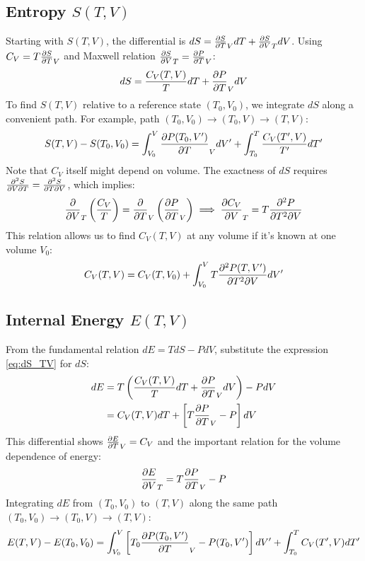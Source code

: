 \documentclass[10pt, letterpaper]{article}
\begin{document}
\subsection{Entropy $S(T,V)$}
Starting with $S(T,V)$, the differential is $dS = \pdv{S}{T}_{V} dT + \pdv{S}{V}_{T} dV$.
Using $C_V = T \pdv{S}{T}_{V}$ and Maxwell relation $\pdv{S}{V}_{T} = \pdv{P}{T}_{V}$:
\begin{equation} \label{eq:dS_TV}
    dS = \frac{C_V(T,V)}{T} dT + \pdv{P}{T}_{V} dV
\end{equation}
To find $S(T,V)$ relative to a reference state $(T_0, V_0)$, we integrate $dS$ along a convenient path. For example, path $(T_0, V_0) \to (T_0, V) \to (T, V)$:
\begin{equation}
    S(T,V) - S(T_0,V_0) = \int_{V_0}^V \pdv{P(T_0, V')}{T}_{V} dV' + \int_{T_0}^T \frac{C_V(T', V)}{T'} dT'
\end{equation}
Note that $C_V$ itself might depend on volume. The exactness of $dS$ requires $\pdv[2]{S}{V}{T} = \pdv[2]{S}{T}{V}$, which implies:
\begin{equation*}
    \pdv{}{V}_T \left( \frac{C_V}{T} \right) = \pdv{}{T}_V \left( \pdv{P}{T}_{V} \right) \implies \pdv{C_V}{V}_{T} = T \pdv[2]{P}{T^2}{V}
\end{equation*}
This relation allows us to find $C_V(T,V)$ at any volume if it's known at one volume $V_0$:
\begin{equation*}
    C_V(T,V) = C_V(T,V_0) + \int_{V_0}^V T \pdv[2]{P(T, V')}{T^2}{V} dV'
\end{equation*}

\subsection{Internal Energy $E(T,V)$}
From the fundamental relation $dE = T dS - P dV$, substitute the expression \eqref{eq:dS_TV} for $dS$:
\begin{align*}
    dE &= T \left( \frac{C_V(T,V)}{T} dT + \pdv{P}{T}_{V} dV \right) - P dV \\
       &= C_V(T,V) dT + \left[ T \pdv{P}{T}_{V} - P \right] dV
\end{align*}
This differential shows $\pdv{E}{T}_{V} = C_V$ and the important relation for the volume dependence of energy:
\begin{equation} \label{eq:dEdV_T}
    \pdv{E}{V}_{T} = T \pdv{P}{T}_{V} - P
\end{equation}
Integrating $dE$ from $(T_0, V_0)$ to $(T, V)$ along the same path $(T_0, V_0) \to (T_0, V) \to (T, V)$:
\begin{equation}
    E(T,V) - E(T_0,V_0) = \int_{V_0}^V \left[ T_0 \pdv{P(T_0, V')}{T}_{V} - P(T_0, V') \right] dV' + \int_{T_0}^T C_V(T', V) dT'
\end{equation}
\end{document}

